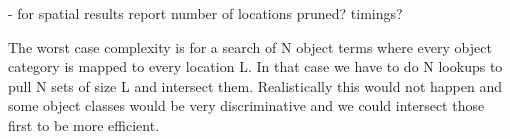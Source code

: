 - for spatial results report number of locations pruned? timings?


The worst case complexity is for a search of N object terms where every object category is mapped to every location L. In that case we have to do N lookups to pull N sets of size L and intersect them. Realistically this would not happen and some object classes would be very discriminative and we could intersect those first to be more efficient.








